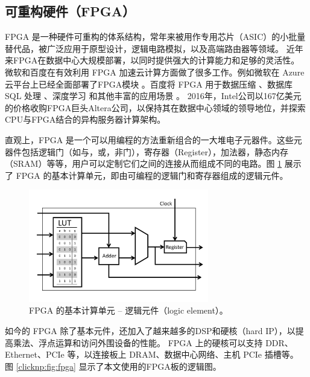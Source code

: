 \subsection{可重构硬件（FPGA）}
\label{smartnic-fpga}

FPGA 是一种硬件可重构的体系结构，常年来被用作专用芯片（ASIC）的小批量替代品，被广泛应用于原型设计，逻辑电路模拟，以及高端路由器等领域。
近年来FPGA在数据中心大规模部署，以同时提供强大的计算能力和足够的灵活性。
微软和百度在有效利用 FPGA 加速云计算方面做了很多工作。例如微软在 Azure 云平台上已经全面部署了FPGA模块 \cite{putnam2014reconfigurable,caulfield2016cloud}。百度将 FPGA 用于数据压缩 \cite{ouyang2010fpga}、数据库 SQL 处理 \cite{baidu-fpga-sql}、深度学习 \cite{ouyang2014sda} 和其他丰富的应用场景 \cite{ouyang2017xpu}。
2016年，Intel公司以167亿美元的价格收购FPGA巨头Altera公司，以保持其在数据中心领域的领导地位，并探索CPU与FPGA结合的异构服务器计算架构。

直观上，FPGA 是一个可以用编程的方法重新组合的一大堆电子元器件。这些元器件包括逻辑门（如与，或，非门），寄存器（Register），加法器，静态内存（SRAM）等等，用户可以定制它们之间的连接从而组成不同的电路。图 \ref{clicknp:fig:logic-block} 展示了 FPGA 的基本计算单元，即由可编程的逻辑门和寄存器组成的逻辑元件。



\begin{figure}[htbp]
	\centering
	\includegraphics[width=0.7\textwidth]{chapters/clicknp/image/logic-block.pdf}
	\caption{FPGA 的基本计算单元 -- 逻辑元件（logic element）。}
	\label{clicknp:fig:logic-block}
\end{figure}



如今的 FPGA 除了基本元件，还加入了越来越多的DSP和硬核（hard IP），以提高乘法、浮点运算和访问外围设备的性能。
FPGA 上的硬核可以支持 DDR、Ethernet、PCIe 等，以连接板上 DRAM、数据中心网络、主机 PCIe 插槽等。
图 \ref{clicknp:fig:fpga} 显示了本文使用的FPGA板的逻辑图。


